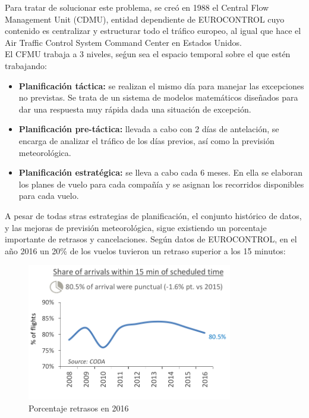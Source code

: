 Para tratar de solucionar este problema, se creó en 1988 el Central Flow Management Unit (CDMU), entidad dependiente de EUROCONTROL cuyo contenido es centralizar y estructurar todo el tráfico europeo, al igual que hace el Air Traffic Control System Command Center en Estados Unidos.\\
El CFMU trabaja a 3 niveles, seǵun sea el espacio temporal sobre el que estén trabajando:
\begin{itemize}
	\item \textbf{Planificación táctica:} se realizan el mismo día para manejar las excepciones no previstas. Se trata de un sistema de modelos matemáticos diseñados para dar una respuesta muy rápida dada una situación de excepción.
	\item \textbf{Planificación pre-táctica:} llevada a cabo con 2 días de antelación, se encarga de analizar el tráfico de los días previos, así como la previsión meteorológica.
	\item \textbf{Planificación estratégica: }se lleva a cabo cada 6 meses. En ella se elaboran los planes de vuelo para cada compañía y se asignan los recorridos disponibles para cada vuelo.
\end{itemize}


	
A pesar de todas stras estrategias de planificación, el conjunto histórico de datos, y las mejoras de previsión meteorológica, sigue existiendo un porcentaje importante de retrasos y cancelaciones. Según datos de EUROCONTROL, en el año 2016 un 20\% de los vuelos tuvieron un retraso superior a los 15 minutos:
\begin{figure}[H]
	\begin{center}
		\centering
		\includegraphics[width=0.8\textwidth]{./imagenes/introduccion/retrasos.png}
		\caption{Porcentaje retrasos en 2016}
		\label{fig: Porcentaje retrasos en 2016}
	\end{center}
\end{figure}


